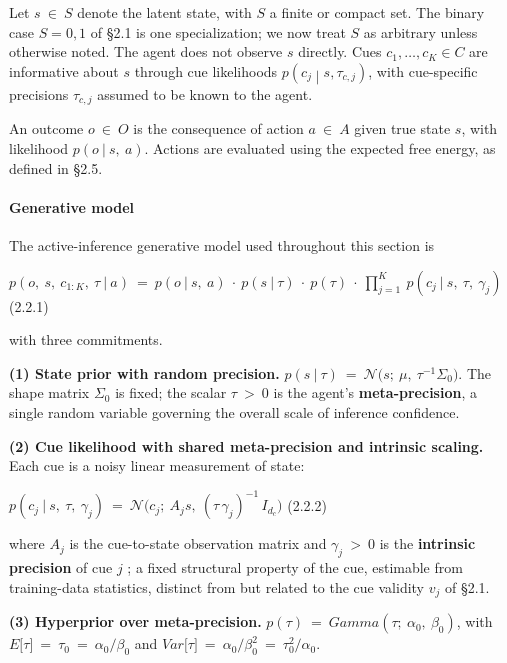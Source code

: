\documentclass{article}
\begin{document}
Let \(s\  \in \ S\) denote the latent state, with \(S\) a finite or
compact set. The binary case \(S = 0,1\) of \S{}2.1 is one specialization;
we now treat \(S\) as arbitrary unless otherwise noted. The agent does
not observe \(s\) directly. Cues \(c_{1},\ldots,c_{K} \in C\) are
informative about \(s\) through cue likelihoods
\(p\left( c_{j} \middle| s,\tau_{c,j} \right)\), with cue-specific
precisions \(\tau_{c,j}\) assumed to be known to the agent.

An outcome \(o\  \in \ O\) is the consequence of action \(a\  \in \ A\)
given true state \(s\), with likelihood \(p(o\ |\ s,\ a)\). Actions are
evaluated using the expected free energy, as defined in \S{}2.5.

\paragraph{Generative model}\label{generative-model}

The active-inference generative model used throughout this section is

\(p(o,\ s,\ c_{1:K},\ \tau\ |\ a)\  = \ p(o\ |\ s,\ a)\  \cdot \ p(s\ |\ \tau)\  \cdot \ p(\tau)\  \cdot \ \prod_{j = 1}^{K}\ p(c_{j}\ |\ s,\ \tau,\ \gamma_{j})\)
(2.2.1)

with three commitments.

\textbf{(1) State prior with random precision.}
\(p(s\ |\ \tau)\  = \ \mathcal{N(}s;\ \mu,\ \tau^{- 1}\Sigma_{0})\). The
shape matrix \(\Sigma_{0}\) is fixed; the scalar \(\tau\  > \ 0\) is the
agent's \textbf{meta-precision}, a single random variable governing the
overall scale of inference confidence.

\textbf{(2) Cue likelihood with shared meta-precision and intrinsic
scaling.} Each cue is a noisy linear measurement of state:

\(p(c_{j}\ |\ s,\ \tau,\ \gamma_{j})\  = \ \mathcal{N(}c_{j};\ A_{j}s,\ (\tau\,\gamma_{j})^{- 1}\, I_{d_{c}})\)
(2.2.2)

where \(A_{j}\) is the cue-to-state observation matrix and
\(\gamma_{j}\  > \ 0\) is the \textbf{intrinsic precision} of cue \(j\)
; a fixed structural property of the cue, estimable from training-data
statistics, distinct from but related to the cue validity \(v_{j}\) of
\S{}2.1.

\textbf{(3) Hyperprior over meta-precision.}
\(p(\tau)\  = \ Gamma(\tau;\ \alpha_{0},\ \beta_{0})\), with
\(E\lbrack\tau\rbrack\  = \ \tau_{0}\  = \ \alpha_{0}/\beta_{0}\) and
\(Var\lbrack\tau\rbrack\  = \ \alpha_{0}/\beta_{0}^{2}\  = \ \tau_{0}^{2}/\alpha_{0}\).
\end{document}
